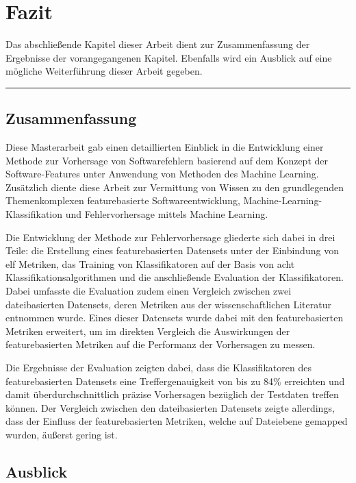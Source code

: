 
\chapter{Fazit}
\label{conclusion}

Das abschließende Kapitel dieser Arbeit dient zur Zusammenfassung der Ergebnisse der vorangegangenen Kapitel. Ebenfalls wird ein Ausblick auf eine mögliche Weiterführung dieser Arbeit gegeben.
\\
\hrule

\section{Zusammenfassung}
Diese Masterarbeit gab einen detaillierten Einblick in die Entwicklung einer Methode zur Vorhersage von Softwarefehlern basierend auf dem Konzept der Software-Features unter Anwendung von Methoden des Machine Learning. Zusätzlich diente diese Arbeit zur Vermittung von Wissen zu den grundlegenden Themenkomplexen \glqq featurebasierte Softwareentwicklung\grqq{}, \glqq Machine-Learning-Klassifikation\grqq{} und \glqq Fehlervorhersage mittels Machine Learning\grqq.

Die Entwicklung der Methode zur Fehlervorhersage gliederte sich dabei in drei Teile: die Erstellung eines featurebasierten Datensets unter der Einbindung von elf Metriken, das Training von Klassifikatoren auf der Basis von acht Klassifikationsalgorithmen und die anschließende Evaluation der Klassifikatoren. Dabei umfasste die Evaluation zudem einen Vergleich zwischen zwei dateibasierten Datensets, deren Metriken aus der wissenschaftlichen Literatur entnommen wurde. Eines dieser Datensets wurde dabei mit den featurebasierten Metriken erweitert, um im direkten Vergleich die Auswirkungen der featurebasierten Metriken auf die Performanz der Vorhersagen zu messen.

Die Ergebnisse der Evaluation zeigten dabei, dass die Klassifikatoren des featurebasierten Datensets eine Treffergenauigkeit von bis zu 84\% erreichten und damit überdurchschnittlich präzise Vorhersagen bezüglich der Testdaten treffen können. Der Vergleich zwischen den dateibasierten Datensets zeigte allerdings, dass der Einfluss der featurebasierten Metriken, welche auf Dateiebene gemapped wurden, äußerst gering ist. 

\section{Ausblick}

